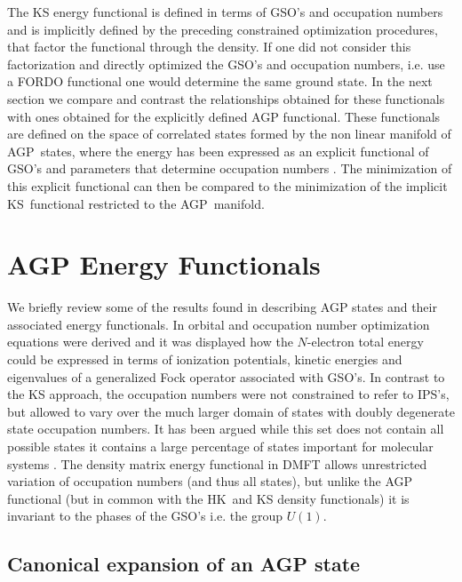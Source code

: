 \documentclass[aps,preprint]{revtex4}%
\begin{document}
The KS energy functional is defined in terms of GSO's and occupation numbers
and is implicitly defined by the preceding constrained optimization
procedures, that factor the functional through the density. If one did not
consider this factorization and directly optimized the GSO's and occupation
numbers, i.e. use a FORDO functional one would determine the same ground
state. In the next section we compare and contrast the relationships obtained
for these functionals with ones obtained for the explicitly defined AGP
functional. These functionals are defined on the space of correlated states
formed by the non linear manifold of AGP\ states, where the energy has been
expressed as an explicit functional of GSO's and parameters that determine
occupation numbers \cite{WeinerOrtiz05}. The minimization of this explicit
functional can then be compared to the minimization of the implicit
KS\ functional restricted to the AGP\ manifold.

\section{AGP Energy Functionals \label{AGP}}

We briefly review some of the results found in \cite{weinerortiz05} describing
AGP states and their associated energy functionals. In \cite{weinerortiz05}
orbital and occupation number optimization equations were derived and it was
displayed how the $N$-electron total energy could be expressed in terms of
ionization potentials, kinetic energies and eigenvalues of a generalized Fock
operator associated with GSO's. In contrast to the KS approach, the occupation
numbers were not constrained to refer to IPS's, but allowed to vary over the
much larger domain of states with doubly degenerate state occupation numbers.
It has been argued while this set does not contain all possible states it
contains a large percentage of states important for molecular systems
\cite{Kramers Deg}. The density matrix energy functional in DMFT allows
unrestricted variation of occupation numbers (and thus all states), but unlike
the AGP functional (but in common with the HK\ and KS density functionals) it
is invariant to the phases of the GSO's i.e. the group $U\left(  1\right)  .$

\subsection{Canonical expansion of an AGP state}
\end{document}
